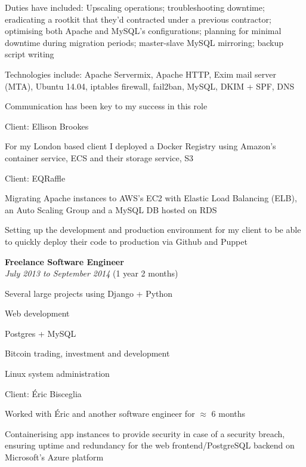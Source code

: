 \documentclass[12pt]{article}
\newenvironment{outerlist}[1][\enskip\textbullet]%
	{\begin{itemize}[#1]}{\end{itemize}%
		\vspace{-.6\baselineskip}}
\newenvironment{innerlist}[1][\enskip\textbullet]%
	{\begin{compactitem}[#1]}{\end{compactitem}}
\newcommand{\halfblankline}{\quad\vspace{-0.5\baselineskip}\pagebreak[3]}
\begin{document}
\begin{outerlist}
\begin{innerlist}
				\item Duties have included: Upscaling operations; troubleshooting downtime; eradicating a rootkit that they'd contracted under a previous contractor; optimising both Apache and MySQL's configurations; planning for minimal downtime during migration periods; master-slave MySQL mirroring; backup script writing
				\item Technologies include: Apache Servermix, Apache HTTP, Exim mail server (MTA), Ubuntu 14.04, iptables firewall, fail2ban, MySQL, DKIM + SPF, DNS
				\item Communication has been key to my success in this role
			\end{innerlist}
			\item[] Client: Ellison Brookes
			\begin{innerlist}
				\item For my London based client I deployed a Docker Registry using Amazon's container service, ECS and their storage service, S3
			\end{innerlist}
			\item[] Client: EQRaffle
			\begin{innerlist}
				\item Migrating Apache instances to AWS's EC2 with Elastic Load Balancing (ELB), an Auto Scaling Group and a MySQL DB hosted on RDS
				\item Setting up the development and production environment for my client to be able to quickly deploy their code to production via Github and Puppet
			\end{innerlist}
			
		\end{outerlist}
		
		\halfblankline
		
		\vspace{-2mm}
		\begin{outerlist}
			\item[] \textbf{Freelance Software Engineer} \\
			\textit{July 2013 to September 2014} (1 year 2 months)
			\begin{innerlist}
				\item Several large projects using Django + Python
				\item Web development
				\item Postgres + MySQL
				\item Bitcoin trading, investment and development
				\item Linux system administration
			\end{innerlist}
			\item[] Client: Éric Bisceglia
			\begin{innerlist}
				\item Worked with Éric and another software engineer for $\approx$ 6 months
				\item Containerising app instances to provide security in case of a security breach, ensuring uptime and redundancy for the web frontend/PostgreSQL backend on Microsoft's Azure platform
			\end{innerlist}
		\end{outerlist}
		
\end{document}
